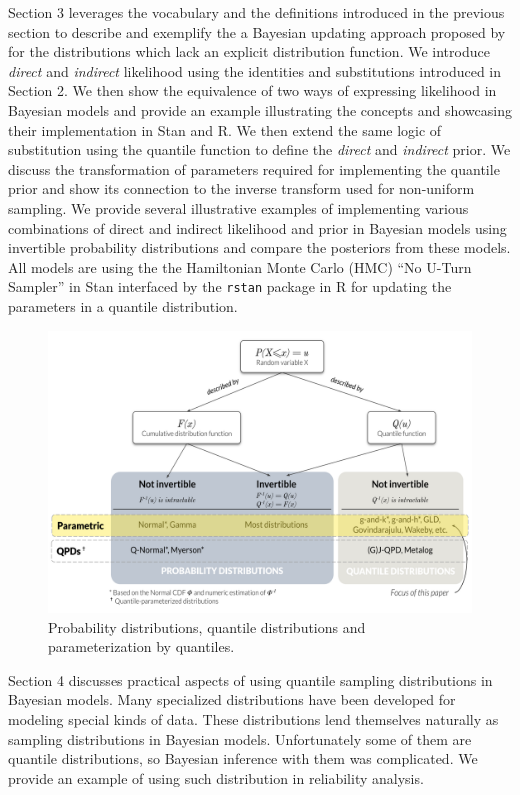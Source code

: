 \documentclass[
  12pt,
]{article}
\begin{document}
Section 3 leverages the vocabulary and the definitions introduced in the previous section to describe and exemplify the a Bayesian updating approach proposed by \citet{nair2020BayesianInferenceQuantile} for the distributions which lack an explicit distribution function. We introduce \emph{direct} and \emph{indirect} likelihood using the identities and substitutions introduced in Section 2. We then show the equivalence of two ways of expressing likelihood in Bayesian models and provide an example illustrating the concepts and showcasing their implementation in Stan and R. We then extend the same logic of substitution using the quantile function to define the \emph{direct} and \emph{indirect} prior. We discuss the transformation of parameters required for implementing the quantile prior and show its connection to the inverse transform used for non-uniform sampling. We provide several illustrative examples of implementing various combinations of direct and indirect likelihood and prior in Bayesian models using invertible probability distributions and compare the posteriors from these models. All models are using the the Hamiltonian Monte Carlo (HMC) ``No U-Turn Sampler'' in Stan interfaced by the \texttt{rstan} package in R\citep{standevelopmentteam2021RStanInterfaceStan} for updating the parameters in a quantile distribution.

\begin{figure}
\includegraphics[width=6in]{img/QDs} \caption{Probability distributions, quantile distributions and parameterization by quantiles.}\label{fig:qdist-chart}
\end{figure}

Section 4 discusses practical aspects of using quantile sampling distributions in Bayesian models. Many specialized distributions have been developed for modeling special kinds of data. These distributions lend themselves naturally as sampling distributions in Bayesian models. Unfortunately some of them are quantile distributions, so Bayesian inference with them was complicated. We provide an example of using such distribution in reliability analysis.
\end{document}
